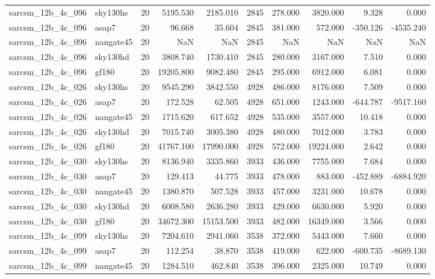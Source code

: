 \begin{longtable}{llrrrrrrrr}
sarcsm\_12b\_4c\_096 & sky130hs & 20 & 5195.530 & 2185.010 & 2845 & 278.000 & 3820.000 & 9.328 & 0.000 \\
sarcsm\_12b\_4c\_096 & asap7 & 20 & 96.668 & 35.604 & 2845 & 381.000 & 572.000 & -350.126 & -4535.240 \\
sarcsm\_12b\_4c\_096 & nangate45 & 20 & NaN & NaN & 2845 & NaN & NaN & NaN & NaN \\
sarcsm\_12b\_4c\_096 & sky130hd & 20 & 3808.740 & 1730.410 & 2845 & 280.000 & 3167.000 & 7.510 & 0.000 \\
sarcsm\_12b\_4c\_096 & gf180 & 20 & 19205.800 & 9082.480 & 2845 & 295.000 & 6912.000 & 6.081 & 0.000 \\
sarcsm\_12b\_4c\_026 & sky130hs & 20 & 9545.290 & 3842.550 & 4928 & 486.000 & 8176.000 & 7.509 & 0.000 \\
sarcsm\_12b\_4c\_026 & asap7 & 20 & 172.528 & 62.505 & 4928 & 651.000 & 1243.000 & -644.787 & -9517.160 \\
sarcsm\_12b\_4c\_026 & nangate45 & 20 & 1715.620 & 617.652 & 4928 & 535.000 & 3557.000 & 10.418 & 0.000 \\
sarcsm\_12b\_4c\_026 & sky130hd & 20 & 7015.740 & 3005.380 & 4928 & 480.000 & 7012.000 & 3.783 & 0.000 \\
sarcsm\_12b\_4c\_026 & gf180 & 20 & 41767.100 & 17990.000 & 4928 & 572.000 & 19224.000 & 2.642 & 0.000 \\
sarcsm\_12b\_4c\_030 & sky130hs & 20 & 8136.940 & 3335.860 & 3933 & 436.000 & 7755.000 & 7.684 & 0.000 \\
sarcsm\_12b\_4c\_030 & asap7 & 20 & 129.413 & 44.775 & 3933 & 478.000 & 883.000 & -452.889 & -6884.920 \\
sarcsm\_12b\_4c\_030 & nangate45 & 20 & 1380.870 & 507.528 & 3933 & 457.000 & 3231.000 & 10.678 & 0.000 \\
sarcsm\_12b\_4c\_030 & sky130hd & 20 & 6008.580 & 2636.280 & 3933 & 429.000 & 6630.000 & 5.920 & 0.000 \\
sarcsm\_12b\_4c\_030 & gf180 & 20 & 34672.300 & 15153.500 & 3933 & 482.000 & 16349.000 & 3.566 & 0.000 \\
sarcsm\_12b\_4c\_099 & sky130hs & 20 & 7204.610 & 2941.060 & 3538 & 372.000 & 5443.000 & 7.660 & 0.000 \\
sarcsm\_12b\_4c\_099 & asap7 & 20 & 112.254 & 38.870 & 3538 & 419.000 & 622.000 & -600.735 & -8689.130 \\
sarcsm\_12b\_4c\_099 & nangate45 & 20 & 1284.510 & 462.840 & 3538 & 396.000 & 2325.000 & 10.749 & 0.000 \\

\end{longtable}
